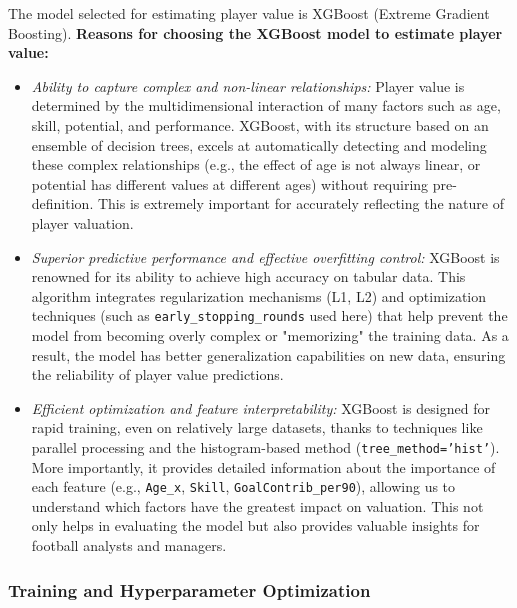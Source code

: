 \documentclass[12pt, a4paper]{report}
\begin{document}
The model selected for estimating player value is XGBoost (Extreme Gradient Boosting).
\textbf{Reasons for choosing the XGBoost model to estimate player value:}
\begin{itemize}
    \item \textit{Ability to capture complex and non-linear relationships:} Player value is determined by the multidimensional interaction of many factors such as age, skill, potential, and performance. XGBoost, with its structure based on an ensemble of decision trees, excels at automatically detecting and modeling these complex relationships (e.g., the effect of age is not always linear, or potential has different values at different ages) without requiring pre-definition. This is extremely important for accurately reflecting the nature of player valuation.
    \item \textit{Superior predictive performance and effective overfitting control:} XGBoost is renowned for its ability to achieve high accuracy on tabular data. This algorithm integrates regularization mechanisms (L1, L2) and optimization techniques (such as \texttt{early\_stopping\_rounds} used here) that help prevent the model from becoming overly complex or "memorizing" the training data. As a result, the model has better generalization capabilities on new data, ensuring the reliability of player value predictions.
    \item \textit{Efficient optimization and feature interpretability:} XGBoost is designed for rapid training, even on relatively large datasets, thanks to techniques like parallel processing and the histogram-based method (\texttt{tree\_method='hist'}). More importantly, it provides detailed information about the importance of each feature (e.g., \texttt{Age\_x}, \texttt{Skill}, \texttt{GoalContrib\_per90}), allowing us to understand which factors have the greatest impact on valuation. This not only helps in evaluating the model but also provides valuable insights for football analysts and managers.
\end{itemize}

\subsubsection{Training and Hyperparameter Optimization}
\end{document}
